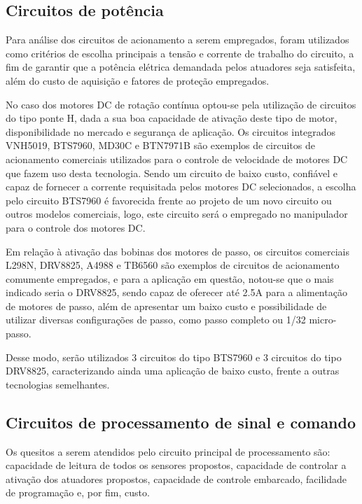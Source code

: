 \subsection{Circuitos de potência}
Para análise dos circuitos de acionamento a serem empregados, foram utilizados como 
critérios de escolha principais a tensão e corrente de trabalho do 
circuito, a fim de garantir que a potência elétrica demandada pelos 
atuadores seja satisfeita, além do custo de aquisição e fatores de proteção 
empregados.


No caso dos motores DC de rotação contínua optou-se pela utilização de 
circuitos do tipo ponte H, dada a sua boa capacidade de ativação deste 
tipo de motor, disponibilidade no mercado e segurança de aplicação. Os 
circuitos integrados VNH5019, BTS7960, MD30C e BTN7971B são exemplos de 
circuitos de acionamento comerciais utilizados para o controle de velocidade de 
motores DC que fazem uso desta tecnologia. 
Sendo um circuito de baixo custo, confiável e capaz de 
fornecer a corrente requisitada pelos motores DC selecionados, a escolha 
pelo circuito BTS7960 é favorecida frente ao projeto de um novo circuito 
ou outros modelos comerciais, logo, este circuito será o empregado no 
manipulador para o controle dos motores DC. 

Em relação à ativação das bobinas dos motores de passo, os circuitos 
comerciais L298N, DRV8825, A4988 e TB6560 são exemplos de circuitos de acionamento
comumente empregados, e para a aplicação em questão, notou-se que o mais indicado seria 
o DRV8825, sendo capaz de oferecer até 2.5A para a alimentação de motores 
de passo, além de apresentar um baixo custo e possibilidade de utilizar
diversas configurações de passo, como passo completo ou 1/32 micro-passo. 

Desse modo, serão utilizados 3 circuitos do tipo BTS7960 e 3 circuitos do 
tipo DRV8825, caracterizando ainda uma aplicação de baixo custo, frente a 
outras tecnologias semelhantes.

\subsection{Circuitos de processamento de sinal e comando}

Os quesitos a serem atendidos pelo circuito principal de processamento são: 
capacidade de leitura de todos os sensores propostos, capacidade de 
controlar a ativação dos atuadores propostos, capacidade de controle 
embarcado, facilidade de programação e, por fim, custo.

